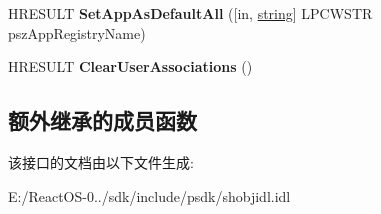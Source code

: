 \begin{DoxyCompactItemize}
\item 
\mbox{\label{interface_i_application_association_registration_ab8fe2cc073a42584e37dd779832bd7fe}} 
H\+R\+E\+S\+U\+LT {\bfseries Set\+App\+As\+Default\+All} (\mbox{[}in, \hyperlink{structstring}{string}\mbox{]} L\+P\+C\+W\+S\+TR psz\+App\+Registry\+Name)
\item 
\mbox{\label{interface_i_application_association_registration_a2e19f6b37b9218a1899c5048da993bb0}} 
H\+R\+E\+S\+U\+LT {\bfseries Clear\+User\+Associations} ()
\end{DoxyCompactItemize}
\subsection*{额外继承的成员函数}


该接口的文档由以下文件生成\+:\begin{DoxyCompactItemize}
\item 
E\+:/\+React\+O\+S-\/0../sdk/include/psdk/shobjidl.\+idl\end{DoxyCompactItemize}
